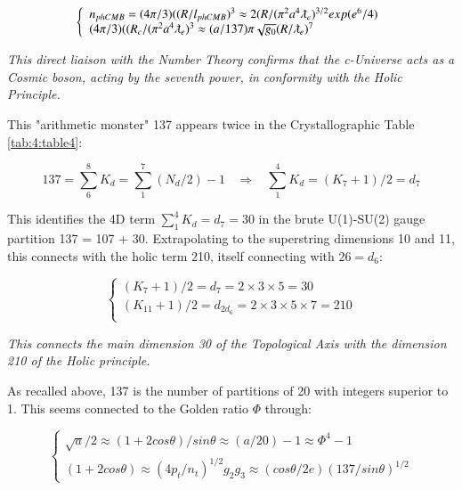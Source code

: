 \documentclass[a4paper,9pt]{article}
\newcounter{row}
\begin{document}
\begin{equation}
 \left\{
    \begin{array}{ll}
    n_{phCMB} = (4\pi/3)((R/l_{phCMB})^{3} \approx 2(R/(\pi^2a^4\lambdabar_e)^{3/2} exp(e^6/4)\\
    
     (4\pi/3)((R_c/(\pi^2a^4\lambdabar_e)^{3} \approx (a/137)\pi \sqrt{g_0} (R/\lambdabar_e)^7

    \end{array}
\right.
\end{equation}

\textit{This direct liaison with the Number Theory confirms that the c-Universe acts as a Cosmic boson, acting by the seventh power, in conformity with the Holic Principle.}

This "arithmetic monster" 137 appears twice in the Crystallographic Table \ref{tab:4:table4}:

\begin{equation}\label{Eq36}
137 = \sum_6^8 K_d = \sum_1^7(N_d/2) -1   ~~~~ \Rightarrow~~~~ \sum_1^4K_d = (K_7+1)/2 = d_7  
 \end{equation}
 
This identifies the 4D term $\sum_1^4K_d =  d_7 = 30$ in the brute U(1)-SU(2) gauge partition 137 = 107 + 30\cite{Taylor}. Extrapolating to the superstring dimensions 10 and 11, this connects with the holic term 210, itself connecting with $26 = d_6$:
 
 \begin{equation}\label{Eq37}
 \left\{
    \begin{array}{ll}
          (K_7+1)/2 = d_7 = 2\times3\times5 = 30\\
          (K_{11}+1)/2 = d_{2d_6} = 2\times3\times5\times7 = 210 \\
    \end{array}
\right.
\end{equation}

\textit{This connects the main dimension 30 of the Topological Axis with the dimension 210 of the Holic principle.}

As recalled above, 137 is the number of partitions of 20 with integers superior to 1. This seems connected to the Golden ratio $\Phi$ through:

\begin{equation}\label{Eq37}
 \left\{
    \begin{array}{ll}
          \sqrt a/2 \approx (1+2cos\theta)/sin\theta \approx (a/20) -1 \approx \Phi^4 - 1 \\
           (1+2cos\theta) \approx (4p_t / n_t)^{1/2} g_2 g_3 \approx (cos\theta / 2e)(137/sin\theta)^{1/2}
    \end{array}
\right.
\end{equation}
\end{document}
